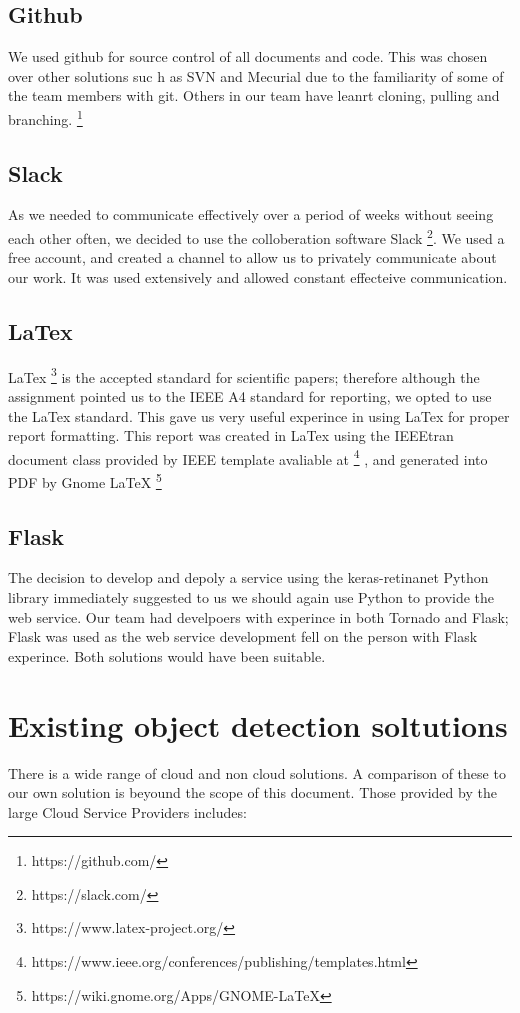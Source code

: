 \documentclass[conference]{IEEEtran}
\begin{document}
\subsection{Github}
We used github for source control of all documents and code. This was chosen over other solutions suc h as SVN and Mecurial due to the familiarity of some of the team members with git. Others in our team have leanrt cloning, pulling and branching. \footnote{https://github.com/}
\subsection{Slack}
As we needed to communicate effectively over a period of weeks without seeing each other often, we decided to use the colloberation software Slack \footnote{https://slack.com/}. We used a free account, and created a channel to allow us to privately communicate about our work. It was used extensively and allowed constant effecteive communication.
\subsection{LaTex}
LaTex \footnote{https://www.latex-project.org/} is the accepted standard for scientific papers; therefore although the assignment pointed us to the IEEE A4 standard for reporting, we opted to use the LaTex standard. This gave us very useful experince in using LaTex for proper report formatting.
This report was created in LaTex using the IEEEtran document class provided by IEEE template avaliable at
\footnote{https://www.ieee.org/conferences/publishing/templates.html}
, and generated into PDF by Gnome LaTeX
\footnote{https://wiki.gnome.org/Apps/GNOME-LaTeX}
\subsection{Flask}
The decision to develop and depoly a service using the keras-retinanet Python library immediately suggested to us we should again use Python to provide the web service. Our team had develpoers with experince in both Tornado and Flask; Flask was used as the web service development fell on the person with Flask experince. Both solutions would have been suitable.
\section{Existing object detection soltutions}
There is a wide range of cloud and non cloud solutions. A comparison of these to our own solution is beyound the scope of this document. Those provided by the large Cloud Service Providers includes:
\end{document}
